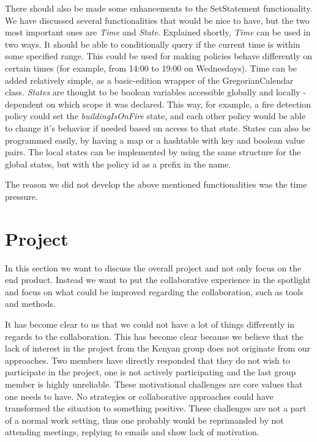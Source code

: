 There should also be made some enhancements to the SetStatement functionality. We have discussed several functionalities that would be nice to have, but the two most important ones are \textit{Time} and \textit{State}. Explained shortly, \textit{Time} can be used in two ways. It should be able to conditionally query if the current time is within some specified range. This could be used for making policies behave differently on certain times (for example, from 14:00 to 19:00 on Wednesdays). Time can be added relatively simple, as a basic-edition wrapper of the GregorianCalendar class. \textit{States} are thought to be boolean variables accessible globally and locally - dependent on which scope it was declared. This way, for example, a fire detection policy could set the \textit{buildingIsOnFire} state, and each other policy would be able to change it's behavior if needed based on access to that state. States can also be programmed easily, by having a map or a hashtable with key and boolean value pairs. The local states can be implemented by using the same structure for the global states, but with the policy id as a prefix in the name.

The reason we did not develop the above mentioned functionalities was the time pressure.

\section{Project}\label{subsec:project}
In this section we want to discuss the overall project and not only focus on the end product. Instead we want to put the collaborative experience in the spotlight and focus on what could be improved regarding the collaboration, such as tools and methods. 

It has become clear to us that we could not have a lot of things differently in regards to the collaboration. This has become clear because we believe that the lack of interest in the project from the Kenyan group does not originate from our approaches. Two members have directly responded that they do not wish to participate in the project, one is not actively participating and the last group member is highly unreliable. These motivational challenges are core values that one needs to have. No strategies or collaborative approaches could have transformed the situation to something positive. These challenges are not a part of a normal work setting, thus one probably would be reprimanded by not attending meetings, replying to emails and show lack of motivation. 


